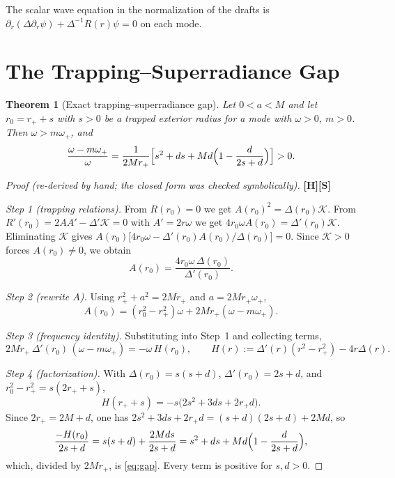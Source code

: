 \documentclass[11pt,a4paper]{article}
\newcommand{\VS}{\textcolor{vs}{\textbf{[S]}}}
\newcommand{\VH}{\textcolor{vh}{\textbf{[H]}}}
\newtheorem{theorem}{Theorem}[section]
\theoremstyle{remark}
\theoremstyle{definition}
\begin{document}
The scalar wave equation in the normalization of the drafts is $\partial_r(\Delta \partial_r\psi) + \Delta^{-1}R(r)\psi = 0$ on each mode.

\section{The Trapping--Superradiance Gap}
\label{sec:gap1}

\begin{theorem}[Exact trapping--superradiance gap]
\label{thm:gap}
Let $0<a<M$ and let $r_0 = r_+ + s$ with $s>0$ be a trapped exterior radius for a mode with $\omega>0$, $m>0$. Then $\omega > m\omega_+$, and
\begin{equation}
\frac{\omega - m\omega_+}{\omega} = \frac{1}{2Mr_+}\Bigl[s^2 + ds + Md\Bigl(1 - \frac{d}{2s+d}\Bigr)\Bigr] > 0. \label{eq:gap}
\end{equation}
\end{theorem}

\begin{proof}[Proof (re-derived by hand; the closed form was checked symbolically)]
\VH\VS

\emph{Step 1 (trapping relations).} From $R(r_0) = 0$ we get $A(r_0)^2 = \Delta(r_0)\mathcal{K}$. From $R'(r_0) = 2A A' - \Delta'\mathcal{K} = 0$ with $A' = 2r\omega$ we get $4r_0\omega A(r_0) = \Delta'(r_0)\mathcal{K}$. Eliminating $\mathcal{K}$ gives $A(r_0)\bigl[4r_0\omega - \Delta'(r_0)A(r_0)/\Delta(r_0)\bigr] = 0$. Since $\mathcal{K} > 0$ forces $A(r_0)\ne 0$, we obtain
\[
A(r_0) = \frac{4r_0\omega\,\Delta(r_0)}{\Delta'(r_0)}.
\]

\emph{Step 2 (rewrite $A$).} Using $r_+^2 + a^2 = 2Mr_+$ and $a = 2Mr_+\omega_+$,
\[
A(r_0) = (r_0^2 - r_+^2)\omega + 2Mr_+(\omega - m\omega_+).
\]

\emph{Step 3 (frequency identity).} Substituting into Step~1 and collecting terms,
\[
2Mr_+\,\Delta'(r_0)\,(\omega - m\omega_+) = -\omega\,H(r_0), \qquad H(r) := \Delta'(r)(r^2 - r_+^2) - 4r\Delta(r).
\]

\emph{Step 4 (factorization).} With $\Delta(r_0) = s(s+d)$, $\Delta'(r_0) = 2s+d$, and $r_0^2 - r_+^2 = s(2r_++s)$,
\[
H(r_+ + s) = -s\bigl(2s^2 + 3ds + 2r_+ d\bigr).
\]
Since $2r_+ = 2M + d$, one has $2s^2+3ds+2r_+d = (s+d)(2s+d) + 2Md$, so
\[
\frac{-H(r_0)}{2s+d} = s(s+d) + \frac{2Mds}{2s+d} = s^2 + ds + Md\Bigl(1 - \frac{d}{2s+d}\Bigr),
\]
which, divided by $2Mr_+$, is \eqref{eq:gap}. Every term is positive for $s,d>0$. \qedhere
\end{proof}
\end{document}
